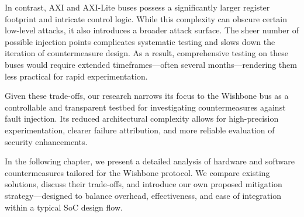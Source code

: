 In contrast, AXI and AXI-Lite buses possess a significantly larger register footprint and intricate control logic. While this complexity can obscure certain low-level attacks, it also introduces a broader attack surface. The sheer number of possible injection points complicates systematic testing and slows down the iteration of countermeasure design. As a result, comprehensive testing on these buses would require extended timeframes—often several months—rendering them less practical for rapid experimentation.

Given these trade-offs, our research narrows its focus to the Wishbone bus as a controllable and transparent testbed for investigating countermeasures against fault injection. Its reduced architectural complexity allows for high-precision experimentation, clearer failure attribution, and more reliable evaluation of security enhancements.

In the following chapter, we present a detailed analysis of hardware and software countermeasures tailored for the Wishbone protocol. We compare existing solutions, discuss their trade-offs, and introduce our own proposed mitigation strategy—designed to balance overhead, effectiveness, and ease of integration within a typical SoC design flow.